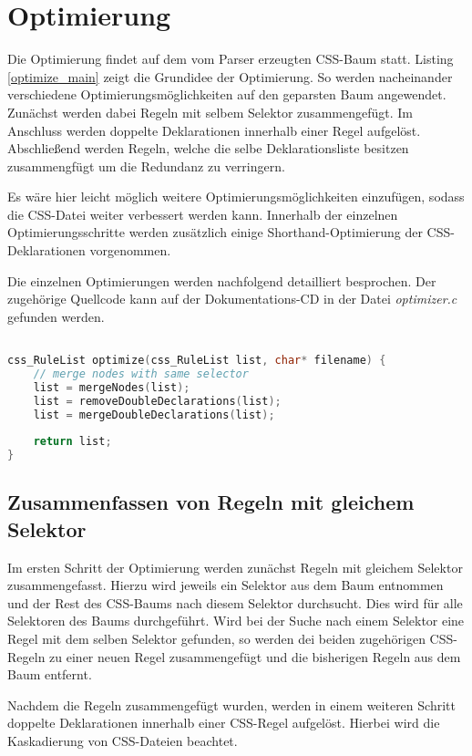 \section{Optimierung}\label{chap_optimization}
Die Optimierung findet auf dem vom Parser erzeugten CSS-Baum statt. Listing \ref{optimize_main} zeigt die Grundidee der Optimierung. So werden nacheinander verschiedene Optimierungsmöglichkeiten auf den geparsten Baum angewendet.
Zunächst werden dabei Regeln mit selbem Selektor zusammengefügt. Im Anschluss werden doppelte Deklarationen innerhalb einer Regel aufgelöst. Abschließend werden Regeln, welche die selbe Deklarationsliste besitzen zusammengfügt um die Redundanz zu verringern.

Es wäre hier leicht möglich weitere Optimierungsmöglichkeiten einzufügen, sodass die CSS-Datei weiter verbessert werden kann.
Innerhalb der einzelnen Optimierungsschritte werden zusätzlich einige Shorthand-Optimierung der CSS-Deklarationen vorgenommen.

Die einzelnen Optimierungen werden nachfolgend detailliert besprochen. Der zugehörige Quellcode kann auf der Dokumentations-CD in der Datei \textit{optimizer.c} gefunden werden.

\begin{lstlisting}[label=optimize_main,language=C, caption=Optimize-Funktion]

css_RuleList optimize(css_RuleList list, char* filename) {
	// merge nodes with same selector
	list = mergeNodes(list);
	list = removeDoubleDeclarations(list);
	list = mergeDoubleDeclarations(list);
	
	return list;
}

\end{lstlisting}


\subsection{Zusammenfassen von Regeln mit gleichem Selektor}
Im ersten Schritt der Optimierung werden zunächst Regeln mit gleichem Selektor zusammengefasst. Hierzu wird jeweils ein Selektor aus dem Baum entnommen und der Rest des CSS-Baums nach diesem Selektor durchsucht. Dies wird für alle Selektoren des Baums durchgeführt.
Wird bei der Suche nach einem Selektor eine Regel mit dem selben Selektor gefunden, so werden dei beiden zugehörigen CSS-Regeln zu einer neuen Regel zusammengefügt und die bisherigen Regeln aus dem Baum entfernt.

Nachdem die Regeln zusammengefügt wurden, werden in einem weiteren Schritt doppelte Deklarationen innerhalb einer CSS-Regel aufgelöst. Hierbei wird die Kaskadierung von CSS-Dateien beachtet.


